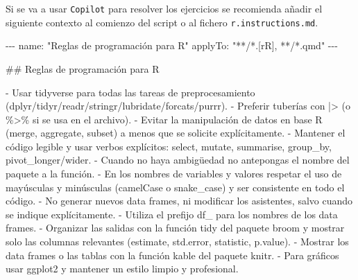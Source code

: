 \documentclass[
  a4paper,
]{scrreport}
\newenvironment{Shaded}{\begin{snugshade}}{\end{snugshade}}
\newcommand{\AnnotationTok}[1]{\textcolor[rgb]{0.37,0.37,0.37}{#1}}
\newcommand{\CommentTok}[1]{\textcolor[rgb]{0.37,0.37,0.37}{#1}}
\newcommand{\FunctionTok}[1]{\textcolor[rgb]{0.28,0.35,0.67}{#1}}
\newcommand{\InformationTok}[1]{\textcolor[rgb]{0.37,0.37,0.37}{#1}}
\newcommand{\NormalTok}[1]{\textcolor[rgb]{0.00,0.23,0.31}{#1}}
\newcommand{\SpecialStringTok}[1]{\textcolor[rgb]{0.13,0.47,0.30}{#1}}
\theoremstyle{definition}
\theoremstyle{remark}
\begin{document}
\begin{tcolorbox}[enhanced jigsaw, colframe=quarto-callout-tip-color-frame, toprule=.15mm, bottomtitle=1mm, breakable, opacitybacktitle=0.6, toptitle=1mm, colback=white, bottomrule=.15mm, title=\textcolor{quarto-callout-tip-color}{\faLightbulb}\hspace{0.5em}{Contexto para Copilot}, arc=.35mm, left=2mm, titlerule=0mm, rightrule=.15mm, coltitle=black, leftrule=.75mm, opacityback=0, colbacktitle=quarto-callout-tip-color!10!white]

Si se va a usar \texttt{Copilot} para resolver los ejercicios se
recomienda añadir el siguiente contexto al comienzo del script o al
fichero \texttt{r.instructions.md}.

\begin{Shaded}
\begin{Highlighting}[]
\CommentTok{{-}{-}{-}}
\AnnotationTok{name:}\CommentTok{ "Reglas de programación para R"}
\AnnotationTok{applyTo:}\CommentTok{ "**/*.[rR], **/*.qmd"}
\CommentTok{{-}{-}{-}}

\FunctionTok{\#\# Reglas de programación para R}

\SpecialStringTok{{-} }\NormalTok{Usar tidyverse para todas las tareas de preprocesamiento (dplyr/tidyr/readr/stringr/lubridate/forcats/purrr).}
\SpecialStringTok{{-} }\NormalTok{Preferir tuberías con |\textgreater{} (o \%\textgreater{}\% si se usa en el archivo).}
\SpecialStringTok{{-} }\NormalTok{Evitar la manipulación de datos en base R (merge, aggregate, subset) a menos que se solicite explícitamente.}
\SpecialStringTok{{-} }\NormalTok{Mantener el código legible y usar verbos explícitos: select, mutate, summarise, group\_by, pivot\_longer/wider.}
\SpecialStringTok{{-} }\NormalTok{Cuando no haya ambigüedad no antepongas el nombre del paquete a la función.}
\SpecialStringTok{{-} }\NormalTok{En los nombres de variables y valores respetar el uso de mayúsculas y minúsculas (camelCase o snake\_case) y ser consistente en todo el código.}
\SpecialStringTok{{-} }\NormalTok{No generar nuevos data frames, ni modificar los asistentes, salvo cuando se indique explícitamente.}
\SpecialStringTok{{-} }\NormalTok{Utiliza el prefijo }\InformationTok{\textasciigrave{}df\_\textasciigrave{}}\NormalTok{ para los nombres de los data frames.}
\SpecialStringTok{{-} }\NormalTok{Organizar las salidas con la función tidy del paquete broom y mostrar solo las columnas relevantes (estimate, std.error, statistic, p.value).}
\SpecialStringTok{{-} }\NormalTok{Mostrar los data frames o las tablas con la función kable del paquete knitr.}
\SpecialStringTok{{-} }\NormalTok{Para gráficos usar ggplot2 y mantener un estilo limpio y profesional.}
\end{Highlighting}
\end{Shaded}

\end{tcolorbox}
\end{document}

